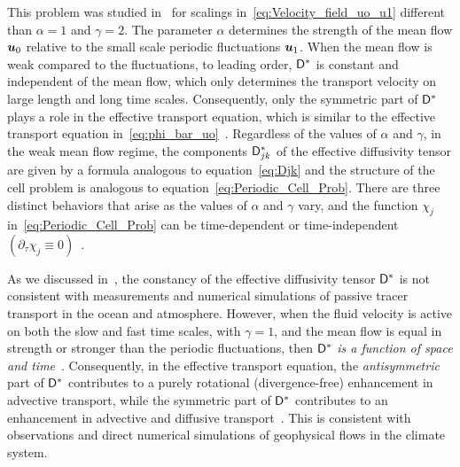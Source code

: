 \documentclass[amsa]{ipart}
\begin{document}
This problem was studied in~\cite{Pavliotis:PHD_Thesis} for 
scalings in~\eqref{eq:Velocity_field_uo_u1} different than $\alpha=1$ and
$\gamma=2$. The parameter $\alpha$ determines the strength of the mean flow $\boldsymbol{u}_0$
relative to the small scale periodic fluctuations $\boldsymbol{u}_1$. When the
mean flow is weak compared to the fluctuations, to leading order,
$\mathsf{D}^*$ is constant and independent of the mean flow, which only
determines the transport velocity on large length and long time
scales. Consequently, only the symmetric part of $\mathsf{D}^*$ plays a role
in the effective transport equation, which is similar to the effective
transport equation 
in~\eqref{eq:phi_bar_uo}~\cite{Pavliotis:PHD_Thesis}. Regardless of
the values of $\alpha$ and $\gamma$, in the weak mean flow regime, the
components $\mathsf{D}^*_{jk}$ of the effective diffusivity tensor are given
by a formula analogous to equation~\eqref{eq:Djk} and the structure of
the cell problem is analogous to
equation~\eqref{eq:Periodic_Cell_Prob}. There are three distinct
behaviors that arise as the values of $\alpha$ and $\gamma$ vary, and the
function $\chi_j$ in~\eqref{eq:Periodic_Cell_Prob} can be time-dependent
or time-independent $(\partial_\tau\chi_j\equiv0)$~\cite{Pavliotis:PHD_Thesis}.



As we discussed in~, the constancy of the
effective diffusivity tensor $\mathsf{D}^*$ is not consistent with
measurements and numerical simulations of passive tracer transport in
the ocean and atmosphere. However, when the fluid velocity is active
on both the slow and fast time scales, with $\gamma=1$, and the mean flow
is equal in strength or stronger than the periodic fluctuations, then
$\mathsf{D}^*$ \emph{ is a function of space and
  time}~\cite{Pavliotis:PHD_Thesis}. Consequently, in the effective  
transport equation, the \emph{antisymmetric} part of $\mathsf{D}^*$ contributes to a
purely rotational (divergence-free) enhancement in advective
transport, while the symmetric part of $\mathsf{D}^*$ contributes to an
enhancement in advective and diffusive
transport~\cite{Pavliotis:PHD_Thesis}. This is consistent with
observations and direct numerical simulations of geophysical flows in
the climate system. 
\end{document}
